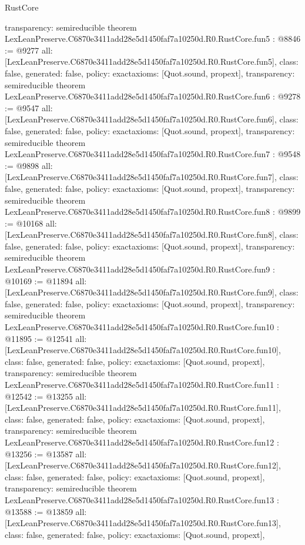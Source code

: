 \begin{lexlean}{RustCore}
\begin{coremodule}
{  transparency: semireducible
}
theorem LexLeanPreserve.C6870e3411add28e5d1450faf7a10250d.R0.RustCore.fun5 : @8846 := @9277 {
  all: [LexLeanPreserve.C6870e3411add28e5d1450faf7a10250d.R0.RustCore.fun5],
  class: false,
  generated: false,
  policy: exact{axioms: [Quot.sound, propext]},
  transparency: semireducible
}
theorem LexLeanPreserve.C6870e3411add28e5d1450faf7a10250d.R0.RustCore.fun6 : @9278 := @9547 {
  all: [LexLeanPreserve.C6870e3411add28e5d1450faf7a10250d.R0.RustCore.fun6],
  class: false,
  generated: false,
  policy: exact{axioms: [Quot.sound, propext]},
  transparency: semireducible
}
theorem LexLeanPreserve.C6870e3411add28e5d1450faf7a10250d.R0.RustCore.fun7 : @9548 := @9898 {
  all: [LexLeanPreserve.C6870e3411add28e5d1450faf7a10250d.R0.RustCore.fun7],
  class: false,
  generated: false,
  policy: exact{axioms: [Quot.sound, propext]},
  transparency: semireducible
}
theorem LexLeanPreserve.C6870e3411add28e5d1450faf7a10250d.R0.RustCore.fun8 : @9899 := @10168 {
  all: [LexLeanPreserve.C6870e3411add28e5d1450faf7a10250d.R0.RustCore.fun8],
  class: false,
  generated: false,
  policy: exact{axioms: [Quot.sound, propext]},
  transparency: semireducible
}
theorem LexLeanPreserve.C6870e3411add28e5d1450faf7a10250d.R0.RustCore.fun9 : @10169 := @11894 {
  all: [LexLeanPreserve.C6870e3411add28e5d1450faf7a10250d.R0.RustCore.fun9],
  class: false,
  generated: false,
  policy: exact{axioms: [Quot.sound, propext]},
  transparency: semireducible
}
theorem LexLeanPreserve.C6870e3411add28e5d1450faf7a10250d.R0.RustCore.fun10 : @11895 := @12541 {
  all: [LexLeanPreserve.C6870e3411add28e5d1450faf7a10250d.R0.RustCore.fun10],
  class: false,
  generated: false,
  policy: exact{axioms: [Quot.sound, propext]},
  transparency: semireducible
}
theorem LexLeanPreserve.C6870e3411add28e5d1450faf7a10250d.R0.RustCore.fun11 : @12542 := @13255 {
  all: [LexLeanPreserve.C6870e3411add28e5d1450faf7a10250d.R0.RustCore.fun11],
  class: false,
  generated: false,
  policy: exact{axioms: [Quot.sound, propext]},
  transparency: semireducible
}
theorem LexLeanPreserve.C6870e3411add28e5d1450faf7a10250d.R0.RustCore.fun12 : @13256 := @13587 {
  all: [LexLeanPreserve.C6870e3411add28e5d1450faf7a10250d.R0.RustCore.fun12],
  class: false,
  generated: false,
  policy: exact{axioms: [Quot.sound, propext]},
  transparency: semireducible
}
theorem LexLeanPreserve.C6870e3411add28e5d1450faf7a10250d.R0.RustCore.fun13 : @13588 := @13859 {
  all: [LexLeanPreserve.C6870e3411add28e5d1450faf7a10250d.R0.RustCore.fun13],
  class: false,
  generated: false,
  policy: exact{axioms: [Quot.sound, propext]},
}
\end{coremodule}
\end{lexlean}
